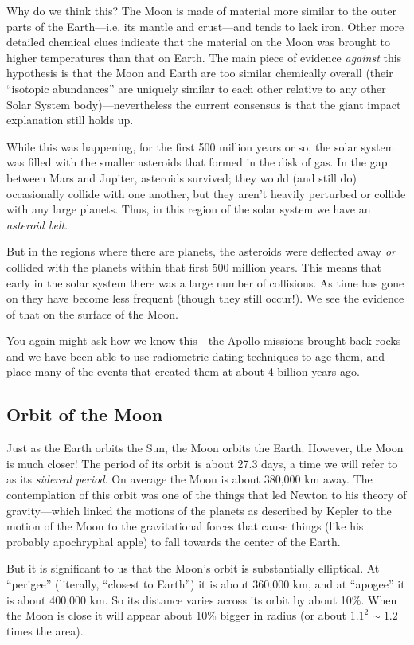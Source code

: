 \documentclass[12pt, preprint]{aastex}
\begin{document}
Why do we think this? The Moon is made of material more similar to the
outer parts of the Earth---i.e. its mantle and crust---and tends to
lack iron. Other more detailed chemical clues indicate that the
material on the Moon was brought to higher temperatures than that on
Earth. The main piece of evidence {\it against} this hypothesis is
that the Moon and Earth are too similar chemically overall (their
``isotopic abundances'' are uniquely similar to each other relative to
any other Solar System body)---nevertheless the current consensus is
that the giant impact explanation still holds up.

While this was happening, for the first 500 million years or so, the
solar system was filled with the smaller asteroids that formed in the
disk of gas. In the gap between Mars and Jupiter, asteroids survived;
they would (and still do) occasionally collide with one another, but
they aren't heavily perturbed or collide with any large planets.
Thus, in this region of the solar system we have an {\it asteroid
  belt}. 

But in the regions where there are planets, the asteroids were
deflected away {\it or} collided with the planets within that first
500 million years. This means that early in the solar system there was
a large number of collisions. As time has gone on they have become
less frequent (though they still occur!). We see the evidence of that
on the surface of the Moon.

You again might ask how we know this---the Apollo missions brought
back rocks and we have been able to use radiometric dating techniques
to age them, and place many of the events that created them at about 4
billion years ago. 

\subsection{Orbit of the Moon}

Just as the Earth orbits the Sun, the Moon orbits the Earth. However,
the Moon is much closer! The period of its orbit is about 27.3 days, a
time we will refer to as its {\it sidereal period}.  On average the
Moon is about 380,000 km away. The contemplation of this orbit was one
of the things that led Newton to his theory of gravity---which linked
the motions of the planets as described by Kepler to the motion of the
Moon to the gravitational forces that cause things (like his probably
apochryphal apple) to fall towards the center of the Earth.

But it is significant to us that the Moon's orbit is substantially
elliptical. At ``perigee'' (literally, ``closest to Earth'') it is
about 360,000 km, and at ``apogee'' it is about 400,000 km. So its
distance varies across its orbit by about 10\%. When the Moon is close
it will appear about 10\% bigger in radius (or about $1.1^2\sim1.2$
times the area).
\end{document}
